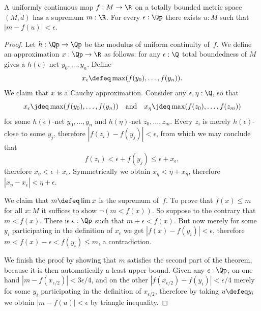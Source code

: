 %
\begin{thm} \label{ctb-uniformly-continuous-sup}
  A uniformly continuous map $f : M \to \R$ on a totally bounded metric space
  $(M, d)$ has a supremum $m : \R$. For every $\epsilon : \Qp$ there exists $u : M$ such
  that $|m - f(u)| < \epsilon$.
\end{thm}

\begin{proof}
  Let $h : \Qp \to \Qp$ be the modulus of uniform continuity of~$f$.
  We define an approximation $x : \Qp \to \R$ as follows: for any $\epsilon : \Q$ total
  boundedness of $M$ gives a $h(\epsilon)$-net $y_0, \ldots, y_n$. Define
  \begin{equation*}
    x_\epsilon \defeq \max (f(y_0), \ldots, f(y_n)).
  \end{equation*}
  We claim that $x$ is a Cauchy approximation. Consider any $\epsilon, \eta : \Q$, so that
  \begin{equation*}
    x_\epsilon \jdeq \max (f(y_0), \ldots, f(y_n))
    \quad\text{and}\quad
    x_\eta \jdeq \max (f(z_0), \ldots, f(z_m))
  \end{equation*}
  for some $h(\epsilon)$-net $y_0, \ldots, y_n$ and $h(\eta)$-net $z_0, \ldots, z_m$.
  Every $z_i$ is merely $h(\epsilon)$-close to some $y_j$, therefore $|f(z_i) - f(y_j)| <
  \epsilon$, from which we may conclude that
  \begin{equation*}
    f(z_i) < \epsilon + f(y_j) \leq \epsilon + x_\epsilon,
  \end{equation*}
  therefore $x_\eta < \epsilon + x_\epsilon$. Symmetrically we obtain $x_\eta < \eta +
  x_\eta$, therefore $|x_\eta - x_\epsilon| < \eta + \epsilon$.

  We claim that $m \defeq \lim x$ is the supremum of~$f$. To prove that $f(x) \leq m$ for
  all $x : M$ it suffices to show $\lnot (m < f(x))$. So suppose to the contrary that $m <
  f(x)$. There is $\epsilon : \Qp$ such that $m + \epsilon < f(x)$. But now merely for
  some $y_i$ participating in the definition of $x_\epsilon$ we get $|f(x) - f(y_i)| <
  \epsilon$, therefore $m < f(x) - \epsilon < f(y_i) \leq m$, a contradiction.

  We finish the proof by showing that $m$ satisfies the second part of the theorem, because
  it is then automatically a least upper bound. Given any $\epsilon : \Qp$, on one hand
  $|m - f(x_{\epsilon/2})| < 3 \epsilon/4$, and on the other $|f(x_{\epsilon/2}) - f(y_i)| <
  \epsilon/4$ merely for some $y_i$ participating in the definition of $x_{\epsilon/2}$,
  therefore by taking $u \defeq y_i$ we obtain $|m - f(u)| < \epsilon$ by triangle
  inequality.
\end{proof}
